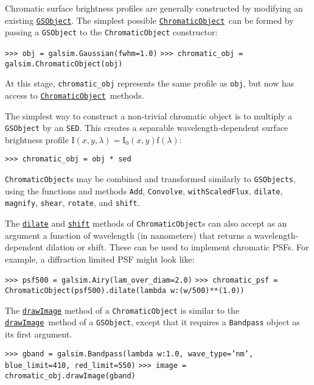 \documentclass[preprint,10pt]{../../devel/modules/aastex}
\newcommand\GSObject{\href{http://galsim-developers.github.io/GalSim/classgalsim_1_1base_1_1_g_s_object.html}{\texttt{GSObject}}}
\newcommand\ChromaticObject{\href{http://galsim-developers.github.io/GalSim/classgalsim_1_1chromatic_1_1_chromatic_object.html}{\texttt{ChromaticObject}}}
\newcommand\drawImage{\href{http://galsim-developers.github.io/GalSim/classgalsim_1_1base_1_1_g_s_object.html\#aafe6ca9d84fe81543fbc105b897273db}{\texttt{drawImage}}}
\begin{document}
Chromatic surface brightness profiles are generally constructed by modifying an existing
\GSObject.  The simplest possible \ChromaticObject\ can be formed by passing a
\texttt{GSObject} to the \texttt{ChromaticObject} constructor:

\texttt{>>> obj = galsim.Gaussian(fwhm=1.0)}\newline
\texttt{>>> chromatic\_obj = galsim.ChromaticObject(obj)}

At this stage, \texttt{chromatic\_obj} represents the same profile as \texttt{obj}, but
now has access to \ChromaticObject\ methods.

The simplest way to construct a non-trivial chromatic object is to multiply a \texttt{GSObject} by
an \texttt{SED}.  This creates a separable wavelength-dependent surface brightness profile
$\mathrm{I}(x, y, \lambda) = \mathrm{I}_0(x, y) \mathrm{f}(\lambda)$:

\texttt{>>> chromatic\_obj = obj * sed}

\texttt{ChromaticObject}s may be combined and transformed similarly to
\texttt{GSObjects}, using the functions and methods \texttt{Add}, \texttt{Convolve}, \texttt{withScaledFlux}, \texttt{dilate}, \texttt{magnify}, \texttt{shear}, \texttt{rotate}, and \texttt{shift}.

The \href{http://galsim-developers.github.io/GalSim/classgalsim_1_1chromatic_1_1_chromatic_object.html#adb05a4f0dadc3c7cbc361ec97984e6f1}{\texttt{dilate}} and \href{http://galsim-developers.github.io/GalSim/classgalsim_1_1chromatic_1_1_chromatic_object.html#ab266ee1207d60ba7a9fb6b32a4ef6ab2}{\texttt{shift}} methods of
\texttt{ChromaticObject}s can also accept as an argument a function of wavelength (in nanometers)
that returns a wavelength-dependent dilation or shift.  These can be used to implement
chromatic PSFs.  For example, a diffraction limited PSF might look
like:

\texttt{>>> psf500 = galsim.Airy(lam\_over\_diam=2.0)}\newline
\texttt{>>> chromatic\_psf = ChromaticObject(psf500).dilate(lambda w:(w/500)**(1.0))}

The \href{http://galsim-developers.github.io/GalSim/classgalsim_1_1chromatic_1_1_chromatic_object.html#a4228098295ee04e4f491567a9ce3b28f}{\texttt{drawImage}} method of a \texttt{ChromaticObject} is similar to the \drawImage\ method of a \texttt{GSObject},
except that it requires a \texttt{Bandpass} object as its first
argument.

\texttt{>>> gband = galsim.Bandpass(lambda w:1.0, wave\_type='nm', blue\_limit=410, red\_limit=550)} \newline
\texttt{>>> image = chromatic\_obj.drawImage(gband)}
\end{document}
